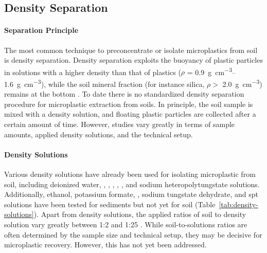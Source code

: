 \subsection{Density Separation}
\label{sec:analytical-techniques:density-separation}

\paragraph{Separation Principle}

The most common technique to preconcentrate or isolate microplastics from soil is density separation. Density separation exploits the buoyancy of plastic particles in solutions with a higher density than that of plastics ($\rho$ = \SIrange{0.9}{1.6}{\gram\per\cubic\centi\meter}),
while the soil mineral fraction (for instance silica, $\rho >$ \SI{2.0}{\gram\per\cubic\centi\meter}) remains at the bottom \citep{EndersEvaluation2020,LiuAnalytical2020}. To date there is no standardized density separation procedure for microplastic extraction from soils. In principle, the soil sample is mixed with a density solution, and floating plastic particles are collected after a certain amount of time. However, studies vary greatly in terms of sample amounts, applied density solutions, and the technical setup.

\paragraph{Density Solutions}

Various density solutions have already been used for isolating microplastic from soil, including deionized water, , ,  , , ,
and sodium heteropolytungstate solutions. Additionally, ethanol, potassium formate,
, sodium tungstate dehydrate, and \ac{spt} solutions have been tested for sediments but not yet for soil
(Table~\ref{tab:density-solutions}). Apart from density solutions, the applied ratios of soil to density solution vary greatly between 1:2 \citep{ChenMixing2020} and 1:25 \citep{ZubrisSynthetic2005}.
While soil-to-solutions ratios are often determined by the sample size and technical setup, they may be decisive for microplastic recovery.
However, this has not yet been addressed.

